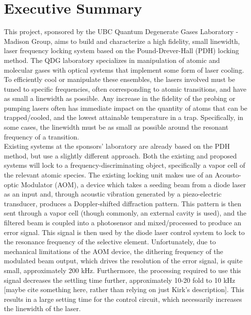 \newpage
\section*{Executive Summary}

This project, sponsored by the UBC Quantum Degenerate Gases
Laboratory - Madison Group, aims to build and characterize a high
fidelity, small linewidth, laser frequency locking system based on the
Pound-Drever-Hall (PDH) locking method. The QDG laboratory 
specializes in manipulation of atomic and molecular gases with
optical systems that implement some form of laser cooling. To 
efficiently cool or manipulate these ensembles, the lasers involved
must be tuned to specific frequencies, often corresponding to atomic
transitions, and have as small a linewidth as possible. Any increase 
in the fidelity of the probing or pumping lasers often has immediate
impact on the quantity of atoms that can be trapped/cooled, and the 
lowest attainable temperature in a trap. Specifically, in some cases, 
the linewidth must be as small as possible around the resonant frequency 
of a transition. \\

Existing systems at the sponsors' laboratory are already based 
on the PDH method, but use a slightly different approach. Both the 
existing and proposed systems will lock to a frequency-discriminating 
object, specifically a vapor cell of the relevant atomic species. The
existing locking unit makes use of an Acousto-optic Modulator (AOM), a 
device which takes a seeding beam from a diode laser as an input and, 
through acoustic vibration generated by a piezo-electric transducer, 
produces a Doppler-shifted diffraction pattern. This pattern is then 
sent through a vapor cell (though commonly, an external cavity is used), 
and the filtered beam is coupled into a photosensor and mixed/processed 
to produce an error signal. This signal is then used by the diode laser 
control system to lock to the resonance frequency of the selective 
element. Unfortunately, due to mechanical limitations of the AOM device, 
the dithering frequency of the modulated beam output, which drives the 
resolution of the error signal, is quite small, approximately 200 kHz. 
Furthermore, the processing required to use this signal decreases the 
settling time further, approximately 10-20 fold to 10 kHz [maybe cite 
something here, rather than relying on just Kirk's description]. This 
results in a large setting time for the control circuit, which 
necessarily increases the linewidth of the laser.  \\

